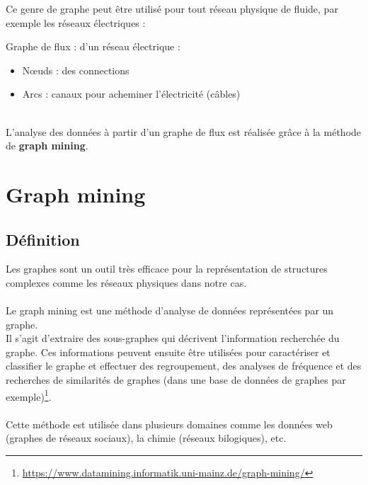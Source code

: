 	\begin{frame}
		Ce genre de graphe peut être utilisé pour tout réseau physique de fluide, par exemple les réseaux électriques :
		\pause
		\begin{exampleblock}{Graphe de flux : d'un réseau électrique :}
		\begin{itemize}
		\item Nœuds : des connections
		\item Arcs : canaux pour acheminer l'électricité (câbles)
		\end{itemize}
		\end{exampleblock}
		~\\
		\pause
		L'analyse des données à partir d'un graphe de flux est réalisée grâce à la méthode de \textbf{graph mining}.
	\end{frame}	
	
	\section{Graph mining}
	\subsection{Définition}
	\begin{frame}
		Les graphes sont un outil très efficace pour la représentation de structures complexes comme les réseaux physiques dans notre cas.\\~\\
		\pause
		Le graph mining est une méthode d'analyse de données représentées par un graphe.\\ 
		\pause
		Il s'agit d'extraire des sous-graphes qui décrivent l'information recherchée du graphe. Ces informations peuvent ensuite être utilisées pour caractériser et classifier le graphe et effectuer des regroupement, des analyses de fréquence et des recherches de similarités de graphes (dans une base de données de graphes par exemple)\footnote{\href{https://www.datamining.informatik.uni-mainz.de/graph-mining/}{https://www.datamining.informatik.uni-mainz.de/graph-mining/}}.\\~\\
		\pause
		Cette méthode est utilisée dans plusieurs domaines comme les données web (graphes de réseaux sociaux), la chimie (réseaux bilogiques), etc.
	\end{frame}
